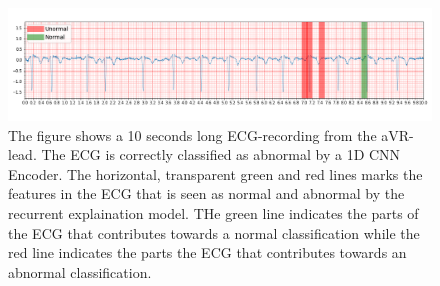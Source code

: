 \begin{figure}[!htp]
    \centering
    \includegraphics[width=1\textwidth]{Figures/Abnormal-aVR.png}
    \caption{The figure shows a 10 seconds long ECG-recording from the aVR-lead. The ECG is correctly classified as abnormal by a 1D CNN Encoder. The horizontal, transparent green and red lines marks the features in the ECG that is seen as normal and abnormal by the recurrent explaination model. THe green line indicates the parts of the ECG that contributes towards a normal classification while the red line indicates the parts the ECG that contributes towards an abnormal classification.}
    \label{fig:expl_cnn}
\end{figure}

\newpage

